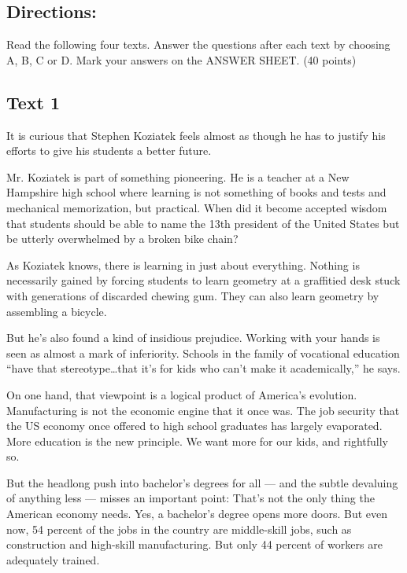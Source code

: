 \documentclass[UTF8,11pt]{ctexart}
\begin{document}
\subsection*{\textbf{Directions:}}


Read the following four texts. Answer the questions after each text by choosing A, B, C or D. Mark your answers on the ANSWER SHEET. (40 points)


\subsection*{\textbf{Text 1}}


It is curious that Stephen Koziatek feels almost as though he has to justify his efforts to give his students a better future.


Mr. Koziatek is part of something pioneering. He is a teacher at a New Hampshire high school where learning is not something of books and tests and mechanical memorization, but practical. When did it become accepted wisdom that students should be able to name the 13th president of the United States but be utterly overwhelmed by a broken bike chain?


As Koziatek knows, there is learning in just about everything. Nothing is necessarily gained by forcing students to learn geometry at a graffitied desk stuck with generations of discarded chewing gum. They can also learn geometry by assembling a bicycle.


But he’s also found a kind of insidious prejudice. Working with your hands is seen as almost a mark of inferiority. Schools in the family of vocational education “have that stereotype…that it’s for kids who can’t make it academically,” he says.


On one hand, that viewpoint is a logical product of America’s evolution. Manufacturing is not the economic engine that it once was. The job security that the US economy once offered to high school graduates has largely evaporated. More education is the new principle. We want more for our kids, and rightfully so.


But the headlong push into bachelor’s degrees for all — and the subtle devaluing of anything less — misses an important point: That’s not the only thing the American economy needs. Yes, a bachelor’s degree opens more doors. But even now, 54 percent of the jobs in the country are middle-skill jobs, such as construction and high-skill manufacturing. But only 44 percent of workers are adequately trained.
\end{document}
